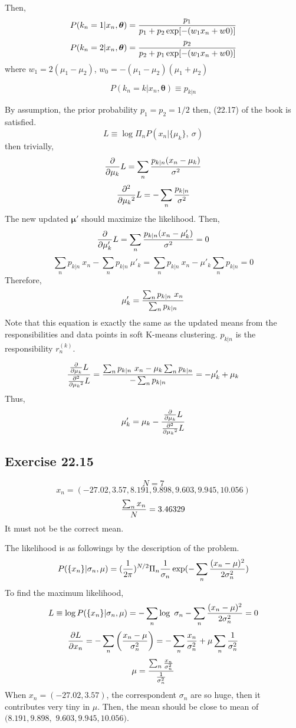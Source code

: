 \documentclass[a4paper,11pt]{article}
\newcommand{\vect}[1]{\boldsymbol{\mathbf{#1}}}
\numberwithin{equation}{section}
\begin{document}
{Then, 
$$
P(k_n=1|x_n,\vect{\theta})= {p_1 \over p_1+p_2 \exp[-(w_1x_n+w0)]}
$$
$$
P(k_n=2|x_n,\vect{\theta})= {p_2 \over p_2+p_1 \exp[-(w_1x_n+w0)]}
$$
where $w_1=2(\mu_1-\mu_2)$, $w_0=-(\mu_1-\mu_2)(\mu_1+\mu_2)$

$$
P(k_n=k|x_n,\vect{\theta}) \equiv p_{k|n}
$$

By assumption, the prior probability $p_1=p_2=1/2$ then, (22.17) of the book is satisfied. 
$$
L\equiv \log \Pi_n P(x_n|\{\mu_k\},~\sigma)
$$
then trivially, 
$$
{\partial \over \partial{\mu_k}}L = \sum_n  {p_{k|n} (x_n-\mu_k)\over \sigma^2}
$$
$$
{\partial^2 \over \partial{\mu_k}^2}L = -\sum_n  {p_{k|n}  \over \sigma^2}
$$
The new updated $\vect \mu'$ should maximize the likelihood. Then,
$$
{\partial \over \partial{\mu_k'}}L = \sum_n  {p_{k|n} (x_n-\mu_k')\over \sigma^2}=0
$$
$$
\sum_n p_{k|n} ~x_n - \sum_n p_{k|n} ~\mu'_k=\sum_n p_{k|n} ~x_n -  \mu'_k\sum_n p_{k|n}=0
$$
Therefore,
$$
\mu'_k={\sum_n p_{k|n} ~x_n \over \sum_n p_{k|n} }
$$
Note that this equation is exactly the same as the updated means from the responsibilities and data points in soft K-means clustering. $p_{k|n}$ is the responsibility $r^{(k)}_n$.

$$
{{\partial \over \partial{\mu_k}}L \over {\partial^2 \over \partial{\mu_k}^2}L  } = {\sum_n p_{k|n} ~x_n -  \mu_k\sum_n p_{k|n} \over -\sum_n p_{k|n}}= -\mu'_k+\mu_k
$$
Thus, 
$$
\mu'_k=\mu_k-{{\partial \over \partial{\mu_k}}L \over {\partial^2 \over \partial{\mu_k}^2}L  }
$$

\subsection{Exercise 22.15}
$$
N=7
$$
$$
x_n=(-27.02, 3.57, 8.191, 9.898, 9.603, 9.945, 10.056)
$$
$$
{\sum_n x_n\over N}=3.46329
$$
It must not be the correct mean. 

The likelihood is as followings by the description of the problem. 
$$
P(\{x_n\}|\sigma_n,\mu) = ({1 \over 2\pi })^{N/2} \Pi_n{1\over \sigma_n } \exp(-\sum_n {(x_n-\mu)^2 \over 2\sigma^2_n})
$$ 
To find the maximum likelihood,
$$
L \equiv \log P(\{x_n\}|\sigma_n,\mu) = -\sum_n \log~\sigma_n-\sum_n {(x_n -\mu)^2 \over 2\sigma_n^2} =0 
$$
$$
{\partial L \over \partial x_n} = -\sum_n \left({x_n-\mu \over \sigma^2_n}\right)=-\sum_n{x_n \over \sigma_n^2}+\mu\sum_n {1 \over \sigma_n^2}
$$
$$
\mu= {\sum_n{x_n\over \sigma_n^2}\over{1\over \sigma_n^2}}
$$
When $x_n=(-27.02, 3.57)$, the correspondent $\sigma_n$ are so huge, then it contributes very tiny in $\mu$. Then, the mean should be close to mean of $(8.191, 9.898,$ 
$9.603, 9.945, 10.056)$.


}
\end{document}
